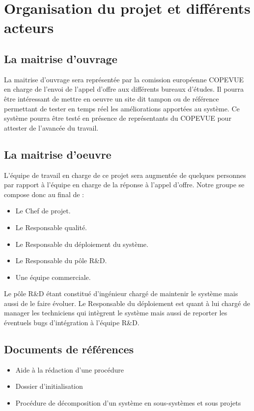 \section{Organisation du projet et différents acteurs}
\subsection{La maitrise d'ouvrage}
La maitrise d'ouvrage sera représentée par la comission européenne COPEVUE en charge de l'envoi de l'appel d'offre aux différents bureaux d'études. Il pourra être intéressant de mettre en oeuvre un site dit tampon ou de référence permettant de tester en temps réel les améliorations apportées au système. Ce système pourra être testé en présence de représentants du
 COPEVUE pour attester de l'avancée du travail.
\subsection{La maitrise d'oeuvre}
L'équipe de travail en charge de ce projet sera augmentée de quelques personnes par rapport à l'équipe en charge de la réponse à l'appel d'offre.
Notre groupe se compose donc au final de :

\begin{itemize}
\item Le Chef de projet.
\item Le Responsable qualité.
\item Le Responsable du déploiement du système.
\item Le Responsable du pôle R\&D.
\item Une équipe commerciale.
\end{itemize}
Le pôle R\&D étant constitué d'ingénieur chargé de maintenir le système mais aussi de le faire évoluer.
Le Responsable du déploiement est quant à lui chargé de manager les techniciens qui intègrent le système mais aussi de reporter les éventuels bugs d'intégration à l'équipe R\&D.

\subsection{Documents de références}
\begin{itemize}
\item Aide à la rédaction d'une procédure
\item Dossier d'initialisation
\item Procédure de décomposition d'un système en sous-systèmes et sous projets
\end{itemize}

